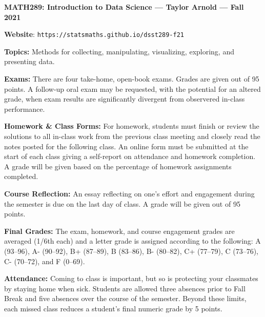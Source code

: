 \documentclass[11pt, a4paper]{article}
\begin{document}
\begin{center}
\textbf{MATH289: Introduction to Data Science --- Taylor Arnold --- Fall 2021}
\end{center}

\vspace{0.5cm}

\textbf{Website}: \texttt{https://statsmaths.github.io/dsst289-f21}

\bigskip

\textbf{Topics:}
Methods for collecting, manipulating, visualizing, exploring, and presenting
data.

\bigskip

\textbf{Exams:}
There are four take-home, open-book exams. Grades are given out of 95 points.
A follow-up oral exam may be requested, with the potential for an altered grade,
when exam results are significantly divergent from observered in-class
performance.

\bigskip

\textbf{Homework \& Class Forms:}
For homework, students must finish or review the solutions to all in-class work
from the previous class meeting and closely read the notes posted for the
following class. An online form must be submitted at the start of each class
giving a self-report on attendance and homework completion. A grade will be
given based on the percentage of homework assignments completed.

\bigskip

\textbf{Course Reflection:}
An essay reflecting on one's effort and engagement during the semester
is due on the last day of class. A grade will be given out of 95 points.

\bigskip

\textbf{Final Grades:}
The exam, homework, and course engagement grades are averaged (1/6th each)
and a letter grade is assigned according to the following:
             A (93--96), A- (90--92),
B+ (87--89), B (83--86), B- (80--82),
C+ (77--79), C (73--76), C- (70--72), and F (0--69).

\bigskip

\textbf{Attendance:}
Coming to class is important, but so is protecting your classmates by staying
home when sick. Students are allowed three absences prior to Fall Break and
five absences over the course of the semester. Beyond these limits, each missed
class reduces a student's final numeric grade by 5 points.

\vspace{0.25cm}

\begin{center}
\end{center}
\end{document}
